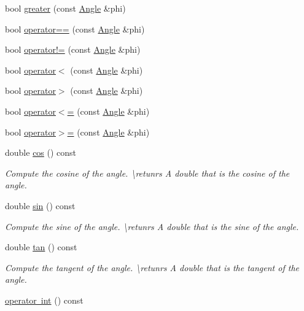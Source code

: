\begin{DoxyCompactItemize}
bool \mbox{\hyperlink{class_angle_a2ead65678819acef29cc4c7f2400f631}{greater}} (const \mbox{\hyperlink{class_angle}{Angle}} \&phi)
\item 
bool \mbox{\hyperlink{class_angle_affdc9a2590df21c00fcbe01e5dadaf25}{operator==}} (const \mbox{\hyperlink{class_angle}{Angle}} \&phi)
\item 
bool \mbox{\hyperlink{class_angle_a8d22835be41b628a5216243b7f7e50a1}{operator!=}} (const \mbox{\hyperlink{class_angle}{Angle}} \&phi)
\item 
bool \mbox{\hyperlink{class_angle_a6771d6e2005dcb8ddb6355349441dc38}{operator$<$}} (const \mbox{\hyperlink{class_angle}{Angle}} \&phi)
\item 
bool \mbox{\hyperlink{class_angle_a5c45045b213db3627055a4591b403224}{operator$>$}} (const \mbox{\hyperlink{class_angle}{Angle}} \&phi)
\item 
bool \mbox{\hyperlink{class_angle_ad18dd2a58b59f2b8d57431cf122f026c}{operator$<$=}} (const \mbox{\hyperlink{class_angle}{Angle}} \&phi)
\item 
bool \mbox{\hyperlink{class_angle_a2cedd44bb72da23b24d2fd57eacf3b79}{operator$>$=}} (const \mbox{\hyperlink{class_angle}{Angle}} \&phi)
\item 
double \mbox{\hyperlink{class_angle_aedc259112dacf9197d787645f7e48911}{cos}} () const
\begin{DoxyCompactList}\small\item\em Compute the cosine of the angle. \textbackslash{}retunrs A {\ttfamily double} that is the cosine of the angle. \end{DoxyCompactList}\item 
double \mbox{\hyperlink{class_angle_a8ef2eabcb790d0b1fee0c2b4abaa50ba}{sin}} () const
\begin{DoxyCompactList}\small\item\em Compute the sine of the angle. \textbackslash{}retunrs A {\ttfamily double} that is the sine of the angle. \end{DoxyCompactList}\item 
double \mbox{\hyperlink{class_angle_a2b1f249db1c3a2b741c2834b2d04d60a}{tan}} () const
\begin{DoxyCompactList}\small\item\em Compute the tangent of the angle. \textbackslash{}retunrs A {\ttfamily double} that is the tangent of the angle. \end{DoxyCompactList}\item 
\mbox{\hyperlink{class_angle_ab4837cee1b926cd3f8f08c91d2d08c70}{operator int}} () const

\end{DoxyCompactItemize}
